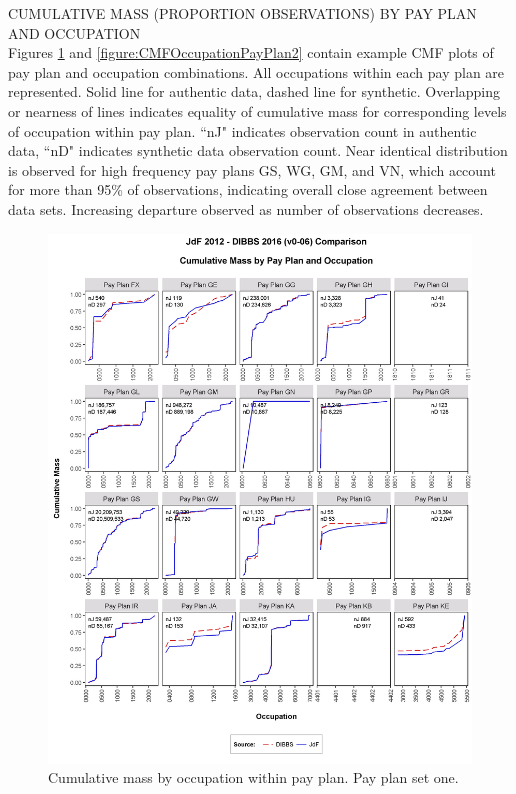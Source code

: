 \documentclass[10pt, letterpaper]{article}
\begin{document}
\begin{spacing}{1.0}
\clearpage

CUMULATIVE MASS (PROPORTION OBSERVATIONS) BY PAY PLAN AND OCCUPATION\\

Figures \ref{figure:CMFOccupationPayPlan1} and \ref{figure:CMFOccupationPayPlan2} contain example CMF plots of pay plan and occupation combinations.  All occupations within each pay plan are represented.  Solid line for authentic data, dashed line for synthetic.  Overlapping or nearness of lines indicates equality of cumulative mass for corresponding levels of occupation within pay plan.  ``nJ" indicates observation count in authentic data, ``nD" indicates synthetic data observation count.  Near identical distribution is observed for high frequency pay plans GS, WG, GM, and VN, which account for more than 95\% of observations, indicating overall close agreement between data sets.  Increasing departure observed as number of observations decreases.\\

\begin{figure}[h!]
    \centering
    \includegraphics[width=5.9in, trim={0 0 0 0.75in}, clip]{CMFOccupationPayPlan61.png}
    \caption{Cumulative mass by occupation within pay plan.  Pay plan set one.}
    \label{figure:CMFOccupationPayPlan1}
\end{figure}


\end{spacing}
\end{document}

